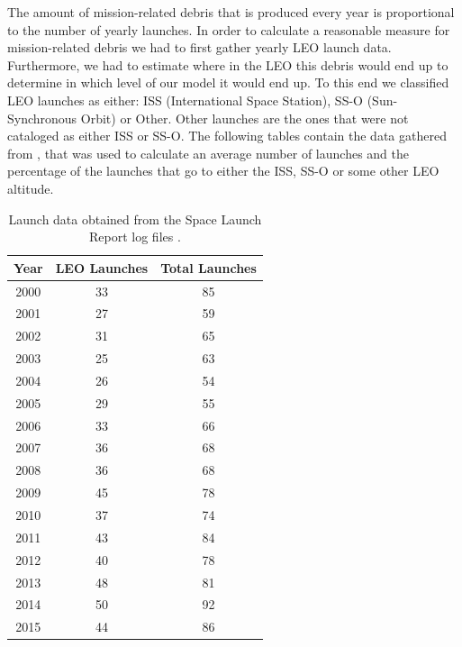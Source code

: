 \documentclass[pre,12pt]{revtex4-1}
\begin{document}
The amount of mission-related debris that is produced every year is proportional to the number of yearly launches. In order to calculate a reasonable measure for mission-related debris we had to first gather yearly LEO launch data. Furthermore, we had to estimate where in the LEO this debris would end up to determine in which level of our model it would end up. To this end we classified LEO launches as either: ISS (International Space Station), SS-O (Sun-Synchronous Orbit) or Other. Other launches are the ones that were not cataloged as either ISS or SS-O. The following tables contain the data gathered from \cite{spaceLaunchReport}, that was used to calculate an average number of launches and the percentage of the launches that go to either the ISS, SS-O or some other LEO altitude.
\
\begin{table}[htb]
    \begin{tabular}{| c | c | c |} \hline
    \textbf{Year} & \textbf{LEO Launches} & \textbf{Total Launches} \\ \hline
    2000 & 33 & 85 \\ \hline
    2001 & 27 & 59 \\ \hline
    2002 & 31 & 65 \\ \hline
    2003 & 25 & 63 \\ \hline
    2004 & 26 & 54 \\ \hline
    2005 & 29 & 55 \\ \hline
    2006 & 33 & 66 \\ \hline
    2007 & 36 & 68 \\ \hline
    2008 & 36 & 68 \\ \hline 
    2009 & 45 & 78 \\ \hline
    2010 & 37 & 74 \\ \hline
    2011 & 43 & 84 \\ \hline
    2012 & 40 & 78 \\ \hline
    2013 & 48 & 81 \\ \hline
    2014 & 50 & 92 \\ \hline
    2015 & 44 & 86 \\ \hline
    \end{tabular}
\caption{Launch data obtained from the Space Launch Report log files \cite{spaceLaunchReport}.}
\end{table}
\end{document}
